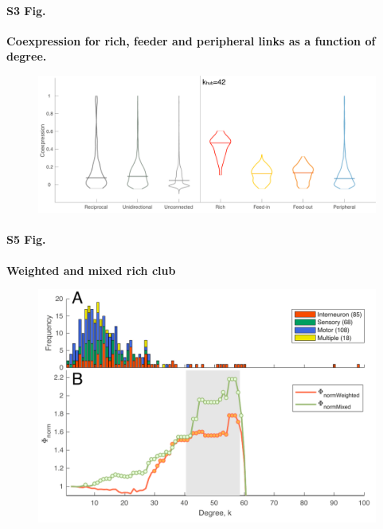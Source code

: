\documentclass[10pt,letterpaper]{article}
\begin{document}
\paragraph*{S3 Fig.}
{\bf Coexpression for rich, feeder and peripheral links as a function of degree.}
\begin{figure}[!h]
\label{S3_Fig}
\centering
    \includegraphics[width=1\textwidth]{Distributions.pdf}
\end{figure}

\paragraph*{S5 Fig.}
{\bf Weighted and mixed rich club}
\begin{figure}[!h]
\label{S5_Fig}
\centering
    \includegraphics[width=1\textwidth]{WeightedMixedRC.pdf}
\end{figure}

\end{document}
